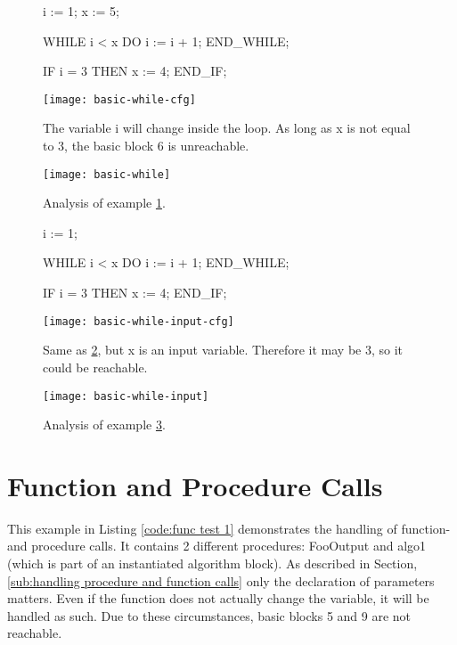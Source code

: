 
\begin{figure}[h!]
	\begin{GenericCode}
i := 1;
x := 5;
		
WHILE i < x DO
	i := i + 1;
END_WHILE;
		
IF i = 3 THEN
	x := 4;
END_IF;	\end{GenericCode}
	\centering
	\texttt{[image: basic-while-cfg]}
	\caption{The variable i will change inside the loop. As long as x is not equal to 3, the basic block 6 is unreachable. }
	\label{code:loop example 1 cfg}
\end{figure}
\begin{figure}[h!]
	\centering
	\texttt{[image: basic-while]}
	\caption{Analysis of example \ref{code:loop example 1 cfg}. }
	\label{code:loop example 1}
\end{figure}
\begin{figure}[h!]
	\begin{GenericCode}
i := 1;
		
WHILE i < x DO
	i := i + 1;
END_WHILE;
		
IF i = 3 THEN
	x := 4;
END_IF;		\end{GenericCode}
	\centering
	\texttt{[image: basic-while-input-cfg]}
	\caption{Same as \ref{code:loop example 1}, but x is an input variable. Therefore it may be 3, so it could be reachable.}
	\label{code:loop example 2 cfg}
\end{figure}
\begin{figure}[h!]
	\centering
	\texttt{[image: basic-while-input]}
	\caption{Analysis of example \ref{code:loop example 2 cfg}.}
	\label{code:loop example 2}
\end{figure}
\section{Function and Procedure Calls}
This example in Listing \ref{code:func test 1} demonstrates the handling of function- and procedure calls. It contains 2 different procedures: FooOutput and algo1 (which is part of an instantiated algorithm block). 
As described in Section, \ref{sub:handling procedure and function calls} only the declaration of parameters matters. Even if the function does not actually change the variable, it will be handled as such. 
Due to these circumstances, basic blocks 5 and 9 are not reachable.



